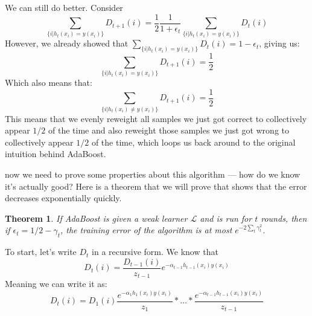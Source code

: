 \documentclass{article}
\newtheorem{thm}{Theorem}
\newcommand{\LL}{\ensuremath{\mathcal{L}}}
\begin{document}
We can still do better. Consider
\begin{equation*}
    \sum_{\{i | h_t(x_i) = y(x_i)\}} D_{t+1}(i) = \frac{1}{2} \frac{1}{1 +
    \epsilon_t} \sum_{\{i | h_t(x_i) = y(x_i)\}} D_{t}(i)
\end{equation*}
However, we already showed that $\sum_{\{i | h_t(x_i) = y(x_i)\}} D_{t}(i) = 1
- \epsilon_t$, giving us:
\begin{equation*}
    \sum_{\{i | h_t(x_i) = y(x_i)\}} D_{t+1}(i) = \frac{1}{2}
\end{equation*}
Which also means that:
\begin{equation*}
    \sum_{\{i | h_t(x_i) \neq y(x_i)\}} D_{t+1}(i) = \frac{1}{2}
\end{equation*}
This means that we evenly reweight all samples we just got correct to
collectively appear $1/2$ of the time and also reweight those samples we just
got wrong to collectively appear $1/2$ of the time, which loops us back around
to the original intuition behind AdaBoost.

now we need to prove some properties about this algorithm --- how do we know
it's actually good? Here is a theorem that we will prove that shows that the
error decreases exponentially quickly.

\begin{framed}
\begin{thm}
    If AdaBoost is given a weak learner $\LL$ and is run for $t$ rounds, then
    if $\epsilon_t = 1/2 - \gamma_t$, the training error of the algorithm is at
    most $e^{-2\sum_{t} \gamma_t^2}$.
\end{thm}
\end{framed}

To start, let's write $D_t$ in a recursive form. We know that
\begin{equation*}
    D_t(i) = \frac{D_{t-1}(i)}{z_{t-1}}e^{-\alpha_{t-1} h_{t-1}(x_i) y({x_i})}
\end{equation*}
Meaning we can write it as:
\begin{equation*}
    D_t(i) = D_1(i)\frac{e^{-\alpha_{1} h_{1}(x_i) y({x_i})}}{z_1}*\dots*
    \frac{e^{-\alpha_{t-1} h_{t-1}(x_i) y({x_i})}}{z_{t-1}}
\end{equation*}
\end{document}
